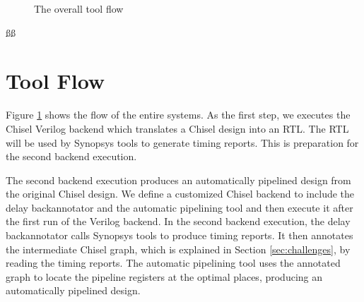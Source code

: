 \begin{figure}
	\centering
    \caption{The overall tool flow}
	\label{fig:toolflow}
\end{figure}
ßß
\section{Tool Flow}
Figure \ref{fig:toolflow} shows the flow of the entire systems. As the first step, we executes the Chisel Verilog backend which translates a Chisel design into an RTL. The RTL will be used by Synopsys tools to generate timing reports. This is preparation for the second backend execution.

The second backend execution produces an automatically pipelined design from the original Chisel design. We define a customized Chisel backend to include the delay backannotator and the automatic pipelining tool and then execute it after the first run of the Verilog backend. In the second backend execution, the delay backannotator calls Synopsys tools to produce timing reports. It then annotates the intermediate Chisel graph, which is explained in Section \ref{sec:challenges}, by reading the timing reports. The automatic pipelining tool uses the annotated graph to locate the pipeline registers at the optimal places, producing an automatically pipelined design.